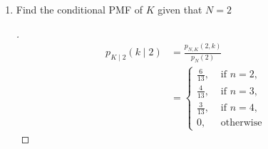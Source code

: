 \documentclass[paper=usletter, fontsize=12pt]{article}
\begin{document}
\begin{enumerate}[label=\textbf{\arabic*}.]
\begin{enumerate}[label=(\alph*)]
            \item Find the conditional PMF of $K$ given that $N=2$
            \begin{proof}[\unskip\nopunct]
                \begingroup
                \addtolength{\jot}{1em}
                \begin{align*}
                    p_{K \mid 2}(k \mid 2) & = \frac{p_{N,K}(2,k)}{p_N(2)} \\
                    & = \begin{cases}
                        \frac{6}{13}, & \text{ if } n = 2, \\
                        \frac{4}{13}, & \text{ if } n = 3, \\
                        \frac{3}{13}, & \text{ if } n = 4, \\
                        0, & \text{ otherwise }
                    \end{cases}
                \end{align*}
                \endgroup \qedhere
            \end{proof}
            \vspace{0.2in}


\end{enumerate}
\end{enumerate}
\end{document}
